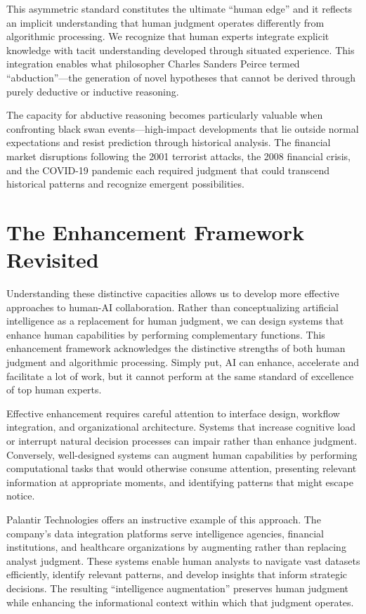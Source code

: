 \documentclass[
  Letterpaper,
]{scrbook}
\begin{document}
This asymmetric standard constitutes the ultimate ``human edge'' and it
reflects an implicit understanding that human judgment operates
differently from algorithmic processing. We recognize that human experts
integrate explicit knowledge with tacit understanding developed through
situated experience. This integration enables what philosopher Charles
Sanders Peirce termed ``abduction''---the generation of novel hypotheses
that cannot be derived through purely deductive or inductive reasoning.

The capacity for abductive reasoning becomes particularly valuable when
confronting black swan events---high-impact developments that lie
outside normal expectations and resist prediction through historical
analysis. The financial market disruptions following the 2001 terrorist
attacks, the 2008 financial crisis, and the COVID-19 pandemic each
required judgment that could transcend historical patterns and recognize
emergent possibilities.

\section{The Enhancement Framework
Revisited}\label{the-enhancement-framework-revisited}

Understanding these distinctive capacities allows us to develop more
effective approaches to human-AI collaboration. Rather than
conceptualizing artificial intelligence as a replacement for human
judgment, we can design systems that enhance human capabilities by
performing complementary functions. This enhancement framework
acknowledges the distinctive strengths of both human judgment and
algorithmic processing. Simply put, AI can enhance, accelerate and
facilitate a lot of work, but it cannot perform at the same standard of
excellence of top human experts.

Effective enhancement requires careful attention to interface design,
workflow integration, and organizational architecture. Systems that
increase cognitive load or interrupt natural decision processes can
impair rather than enhance judgment. Conversely, well-designed systems
can augment human capabilities by performing computational tasks that
would otherwise consume attention, presenting relevant information at
appropriate moments, and identifying patterns that might escape notice.

Palantir Technologies offers an instructive example of this approach.
The company's data integration platforms serve intelligence agencies,
financial institutions, and healthcare organizations by augmenting
rather than replacing analyst judgment. These systems enable human
analysts to navigate vast datasets efficiently, identify relevant
patterns, and develop insights that inform strategic decisions. The
resulting ``intelligence augmentation'' preserves human judgment while
enhancing the informational context within which that judgment operates.
\end{document}

